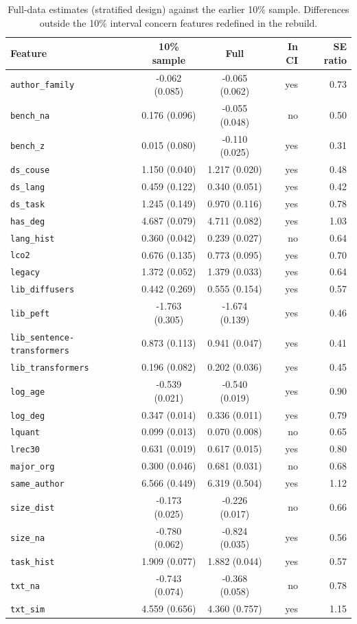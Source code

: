 \begin{table}[htbp]
\centering
\caption{Full-data estimates (stratified design) against the earlier 10\% sample. Differences outside the 10\% interval concern features redefined in the rebuild.}
\label{tab:validate}
\scriptsize
\begin{tabular}{lccrr}
\toprule
Feature & 10\% sample & Full & In CI & SE ratio \\
\midrule
\texttt{author\_family} & -0.062 (0.085) & -0.065 (0.062) & yes & 0.73 \\
\texttt{bench\_na} & 0.176 (0.096) & -0.055 (0.048) & no & 0.50 \\
\texttt{bench\_z} & 0.015 (0.080) & -0.110 (0.025) & yes & 0.31 \\
\texttt{ds\_couse} & 1.150 (0.040) & 1.217 (0.020) & yes & 0.48 \\
\texttt{ds\_lang} & 0.459 (0.122) & 0.340 (0.051) & yes & 0.42 \\
\texttt{ds\_task} & 1.245 (0.149) & 0.970 (0.116) & yes & 0.78 \\
\texttt{has\_deg} & 4.687 (0.079) & 4.711 (0.082) & yes & 1.03 \\
\texttt{lang\_hist} & 0.360 (0.042) & 0.239 (0.027) & no & 0.64 \\
\texttt{lco2} & 0.676 (0.135) & 0.773 (0.095) & yes & 0.70 \\
\texttt{legacy} & 1.372 (0.052) & 1.379 (0.033) & yes & 0.64 \\
\texttt{lib\_diffusers} & 0.442 (0.269) & 0.555 (0.154) & yes & 0.57 \\
\texttt{lib\_peft} & -1.763 (0.305) & -1.674 (0.139) & yes & 0.46 \\
\texttt{lib\_sentence-transformers} & 0.873 (0.113) & 0.941 (0.047) & yes & 0.41 \\
\texttt{lib\_transformers} & 0.196 (0.082) & 0.202 (0.036) & yes & 0.45 \\
\texttt{log\_age} & -0.539 (0.021) & -0.540 (0.019) & yes & 0.90 \\
\texttt{log\_deg} & 0.347 (0.014) & 0.336 (0.011) & yes & 0.79 \\
\texttt{lquant} & 0.099 (0.013) & 0.070 (0.008) & no & 0.65 \\
\texttt{lrec30} & 0.631 (0.019) & 0.617 (0.015) & yes & 0.80 \\
\texttt{major\_org} & 0.300 (0.046) & 0.681 (0.031) & no & 0.68 \\
\texttt{same\_author} & 6.566 (0.449) & 6.319 (0.504) & yes & 1.12 \\
\texttt{size\_dist} & -0.173 (0.025) & -0.226 (0.017) & no & 0.66 \\
\texttt{size\_na} & -0.780 (0.062) & -0.824 (0.035) & yes & 0.56 \\
\texttt{task\_hist} & 1.909 (0.077) & 1.882 (0.044) & yes & 0.57 \\
\texttt{txt\_na} & -0.743 (0.074) & -0.368 (0.058) & no & 0.78 \\
\texttt{txt\_sim} & 4.559 (0.656) & 4.360 (0.757) & yes & 1.15 \\
\bottomrule
\end{tabular}
\end{table}
